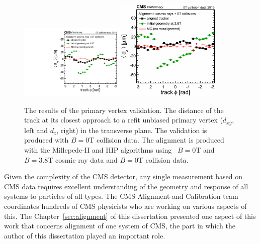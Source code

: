 \begin{figure}[htb]
    \begin{center}
        \includegraphics[width=0.45\textwidth]{../figs/Alignment/AlRes_dxyPhiBiasCanvas.pdf}\includegraphics[width=0.45\textwidth]{../figs/Alignment/AlRes_dzPhiBiasCanvas.png}
    \end{center}
    \caption{The results of the primary vertex validation. The distance of the track at its closest approach to a refit unbiased primary vertex ($d_{xy}$, left and $d_z$, right) in the transverse plane. The validation is produced with $B=0$T collision data. The alignment is produced with the Millepede-II and HIP algorithms using ~$B=0$T and~$B=3.8$T cosmic ray data and $B=0$T collision data. }
    \label{fig:PVvalidation}
\end{figure}


Given the complexity of the CMS detector, any single measurement based on CMS data requires excellent understanding of the geometry and response of all systems to particles of all types. The CMS Alignment and Calibration team coordinates hundreds of CMS physicists who are working on various aspects of this. The Chapter~\ref{sec:alignment} of this dissertation presented one aspect of this work that concerns alignment of one system of CMS, the part in which the author of this dissertation played an important role.

